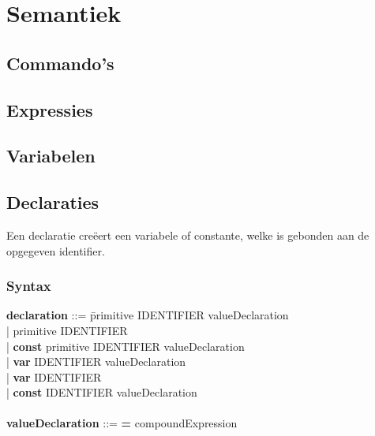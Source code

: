 \chapter{Semantiek}

\section{Commando's}

\section{Expressies}

\section{Variabelen}


\section{Declaraties}
Een declaratie cre\"{e}ert een variabele of constante, welke is gebonden aan de opgegeven identifier.
    \subsection{Syntax}    
        \begin{tabbing}
            {\bf declaration}         ::= \=primitive IDENTIFIER valueDeclaration\\
                                      \>| primitive IDENTIFIER\\
                                      \>| \textbf{const} primitive IDENTIFIER valueDeclaration\\
                                      \>| \textbf{var} IDENTIFIER valueDeclaration\\
                                      \>| \textbf{var} IDENTIFIER\\
                                      \>| \textbf{const} IDENTIFIER valueDeclaration\\
            \\
            {\bf valueDeclaration}    ::= \textbf{=} compoundExpression\\
        \end{tabbing}
